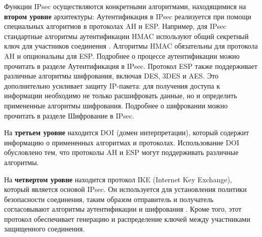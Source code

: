 Функции IPsec осуществляются конкретными алгоритмами, находящимися на \textbf{втором уровне} архитектуры: Аутентификация в IPsec реализуется при помощи специальных алгоритмов в протоколах AH и ESP. Например, для IPsec стандартные алгоритмы аутентификации HMAC используют общий секретный ключ для участников соединения \cite{hmac}. Алгоритмы HMAC обязательны для протокола AH и опциональны для ESP. Подробнее о процессе аутентификации можно прочитать в разделе Аутентификация в IPsec. Протокол ESP также поддерживает различные алгоритмы шифрования, включая DES, 3DES и AES. Это дополнительно усиливает защиту IP-пакета: для получения доступа к информации необходимо не только расшифровать данные, но и определить примененные алгоритмы шифрования. Подробнее о шифровании можно прочитать в разделе Шифрование в IPsec.

На \textbf{третьем уровне} находится DOI (домен интерпретации), который содержит информацию о примененных алгоритмах и протоколах. Использование DOI обусловлено тем, что протоколы AH и ESP могут поддерживать различные алгоритмы.

На \textbf{четвертом уровне} находится протокол IKE (Internet Key Exchange), который является основой IPsec. Он используется для установления политики безопасности соединения, таким образом отправитель и получатель согласовывают алгоритмы аутентификации и шифрования \cite{ike}. Кроме того, этот протокол обеспечивает генерацию и распределение ключей между участниками защищенного соединения.

\pagebreak
